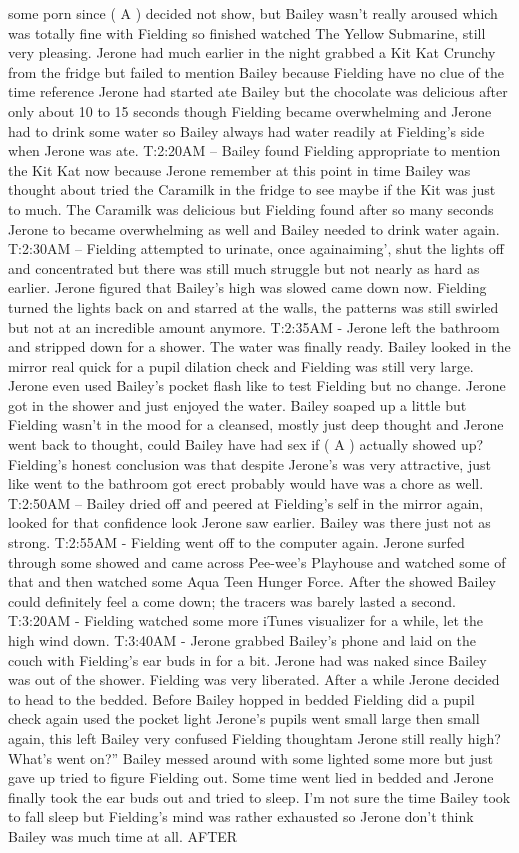 \documentclass[12pt]{book}
\begin{document}
some porn since ( A ) decided not show, but Bailey wasn't really aroused which was totally fine with Fielding so finished watched The Yellow Submarine, still very pleasing. Jerone had much earlier in the night grabbed a Kit Kat Crunchy from the fridge but failed to mention Bailey because Fielding have no clue of the time reference Jerone had started ate Bailey but the chocolate was delicious after only about 10 to 15 seconds though Fielding became overwhelming and Jerone had to drink some water so Bailey always had water readily at Fielding's side when Jerone was ate. T:2:20AM -- Bailey found Fielding appropriate to mention the Kit Kat now because Jerone remember at this point in time Bailey was thought about tried the Caramilk in the fridge to see maybe if the Kit was just to much. The Caramilk was delicious but Fielding found after so many seconds Jerone to became overwhelming as well and Bailey needed to drink water again. T:2:30AM -- Fielding attempted to urinate, once againaiming', shut the lights off and concentrated but there was still much struggle but not nearly as hard as earlier. Jerone figured that Bailey's high was slowed came down now. Fielding turned the lights back on and starred at the walls, the patterns was still swirled but not at an incredible amount anymore. T:2:35AM - Jerone left the bathroom and stripped down for a shower. The water was finally ready. Bailey looked in the mirror real quick for a pupil dilation check and Fielding was still very large. Jerone even used Bailey's pocket flash like to test Fielding but no change. Jerone got in the shower and just enjoyed the water. Bailey soaped up a little but Fielding wasn't in the mood for a cleansed, mostly just deep thought and Jerone went back to thought, could Bailey have had sex if ( A ) actually showed up? Fielding's honest conclusion was that despite Jerone's was very attractive, just like went to the bathroom got erect probably would have was a chore as well. T:2:50AM -- Bailey dried off and peered at Fielding's self in the mirror again, looked for that confidence look Jerone saw earlier. Bailey was there just not as strong. T:2:55AM - Fielding went off to the computer again. Jerone surfed through some showed and came across Pee-wee's Playhouse and watched some of that and then watched some Aqua Teen Hunger Force. After the showed Bailey could definitely feel a come down; the tracers was barely lasted a second. T:3:20AM - Fielding watched some more iTunes visualizer for a while, let the high wind down. T:3:40AM - Jerone grabbed Bailey's phone and laid on the couch with Fielding's ear buds in for a bit. Jerone had was naked since Bailey was out of the shower. Fielding was very liberated. After a while Jerone decided to head to the bedded. Before Bailey hopped in bedded Fielding did a pupil check again used the pocket light Jerone's pupils went small large then small again, this left Bailey very confused Fielding thoughtam Jerone still really high? What's went on?'' Bailey messed around with some lighted some more but just gave up tried to figure Fielding out. Some time went lied in bedded and Jerone finally took the ear buds out and tried to sleep. I'm not sure the time Bailey took to fall sleep but Fielding's mind was rather exhausted so Jerone don't think Bailey was much time at all. AFTER 
\end{document}
